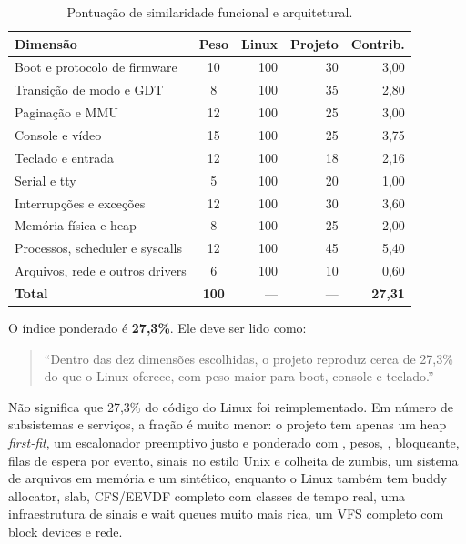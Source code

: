 \begin{table}[H]
\centering
\caption{Pontua\c{c}\~ao de similaridade funcional e arquitetural.}
\label{tab:score}
\begin{tabular}{@{}lcrrr@{}}
\toprule
\textbf{Dimens\~ao} & \textbf{Peso} & \textbf{Linux} & \textbf{Projeto} & \textbf{Contrib.} \\
\midrule
Boot e protocolo de firmware & 10 & 100 & 30 & 3,00 \\
Transi\c{c}\~ao de modo e GDT & 8 & 100 & 35 & 2,80 \\
Pagina\c{c}\~ao e MMU & 12 & 100 & 25 & 3,00 \\
Console e v\'ideo & 15 & 100 & 25 & 3,75 \\
Teclado e entrada & 12 & 100 & 18 & 2,16 \\
Serial e tty & 5 & 100 & 20 & 1,00 \\
Interrup\c{c}\~oes e exce\c{c}\~oes & 12 & 100 & 30 & 3,60 \\
Mem\'oria f\'isica e heap & 8 & 100 & 25 & 2,00 \\
Processos, scheduler e syscalls & 12 & 100 & 45 & 5,40 \\
Arquivos, rede e outros drivers & 6 & 100 & 10 & 0,60 \\
\midrule
\textbf{Total} & \textbf{100} & --- & --- & \textbf{27,31} \\
\bottomrule
\end{tabular}
\end{table}

O \'indice ponderado \'e \textbf{27,3\%}. Ele deve ser lido como:

\begin{quote}
``Dentro das dez dimens\~oes escolhidas, o projeto reproduz cerca de 27,3\%
do que o Linux oferece, com peso maior para boot, console e teclado.''
\end{quote}

N\~ao significa que 27,3\% do c\'odigo do Linux foi reimplementado. Em
n\'umero de subsistemas e servi\c{c}os, a fra\c{c}\~ao \'e muito menor: o
projeto tem apenas um heap \emph{first-fit}, um escalonador preemptivo justo
e ponderado com , pesos, ,  bloqueante,
filas de espera por evento, sinais no estilo Unix e colheita de zumbis, um
sistema de arquivos em mem\'oria e um  sint\'etico, enquanto o
Linux tamb\'em tem buddy allocator, slab, CFS/EEVDF completo com classes de
tempo real, uma infraestrutura de sinais e wait queues muito mais rica, um VFS
completo com block devices e rede.


